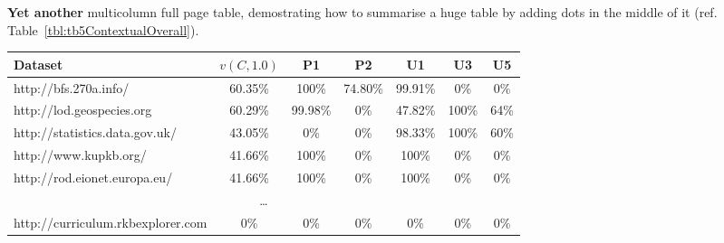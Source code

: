 \documentclass{sig-alternate-05-2015}
\begin{document}
\textbf{Yet another} multicolumn full page table, demostrating how to summarise a huge table by adding dots in the middle of it (ref. Table~\ref{tbl:tb5ContextualOverall}).
\begin{table}[]
\centering
\begin{tabular}{lcccccc}
\hline
\multicolumn{1}{l|}{\textbf{Dataset}}                         & \multicolumn{1}{c|}{\textbf{$v(C,1.0)$}} & \multicolumn{1}{c|}{\textbf{P1}} & \multicolumn{1}{c|}{\textbf{P2}} & \multicolumn{1}{c|}{\textbf{U1}} & \multicolumn{1}{c|}{\textbf{U3}} & \textbf{U5} \\ \hline
\multicolumn{1}{l|}{http://bfs.270a.info/}                    & \multicolumn{1}{c|}{60.35\%}              & \multicolumn{1}{c|}{100\%}       & \multicolumn{1}{c|}{74.80\%}        & \multicolumn{1}{c|}{99.91\%}       & \multicolumn{1}{c|}{0\%}         & 0\%         \\
\multicolumn{1}{l|}{http://lod.geospecies.org}                & \multicolumn{1}{c|}{60.29\%}              & \multicolumn{1}{c|}{99.98\%}       & \multicolumn{1}{c|}{0\%}         & \multicolumn{1}{c|}{47.82\%}        & \multicolumn{1}{c|}{100\%}       & 64\%        \\
\multicolumn{1}{l|}{http://statistics.data.gov.uk/}           & \multicolumn{1}{c|}{43.05\%}              & \multicolumn{1}{c|}{0\%}         & \multicolumn{1}{c|}{0\%}         & \multicolumn{1}{c|}{98.33\%}        & \multicolumn{1}{c|}{100\%}       & 60\%        \\
\multicolumn{1}{l|}{http://www.kupkb.org/}                    & \multicolumn{1}{c|}{41.66\%}              & \multicolumn{1}{c|}{100\%}       & \multicolumn{1}{c|}{0\%}         & \multicolumn{1}{c|}{100\%}       & \multicolumn{1}{c|}{0\%}         & 0\%         \\
\multicolumn{1}{l|}{http://rod.eionet.europa.eu/}             & \multicolumn{1}{c|}{41.66\%}              & \multicolumn{1}{c|}{100\%}       & \multicolumn{1}{c|}{0\%}         & \multicolumn{1}{c|}{100\%}       & \multicolumn{1}{c|}{0\%}         & 0\%         \\
\multicolumn{7}{c}{\dots}                                                                                                                                                                                                                                            \\
\multicolumn{1}{l|}{http://curriculum.rkbexplorer.com}                      & \multicolumn{1}{c|}{0\%}               & \multicolumn{1}{c|}{0\%}         & \multicolumn{1}{c|}{0\%}         & \multicolumn{1}{c|}{0\%}         & \multicolumn{1}{c|}{0\%}         & 0\%         \\

\end{tabular}
\end{table}
\end{document}
